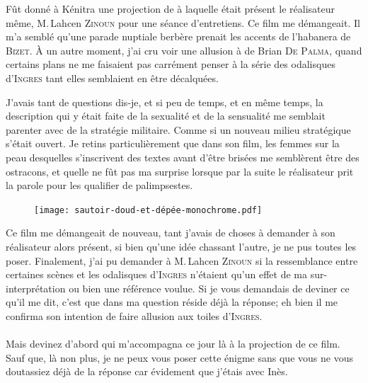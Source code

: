 \begin{prose}
  Fût donné à Kénitra une projection de  à laquelle était présent le réalisateur même, M.\,Lahcen \textsc{Zinoun} pour une séance d’entretiens. Ce film me démangeait. Il m’a semblé qu’une parade nuptiale berbère prenait les accents de l’habanera  de \textsc{Bizet}. À un autre moment, j’ai cru voir une allusion à  de Brian \textsc{De Palma}, quand certains plans ne me faisaient pas carrément penser à la série des odalisques d’\textsc{Ingres} tant elles semblaient en être décalquées.

  J’avais tant de questions dis-je, et si peu de temps, et en même temps, la description qui y était faite de la sexualité et de la sensualité me semblait parenter avec de la stratégie militaire. Comme si un nouveau milieu stratégique s’était ouvert. Je retins particulièrement que dans son film, les femmes sur la peau desquelles s’inscrivent des textes avant d’être brisées me semblèrent être des ostracons, et quelle ne fût pas ma surprise lorsque par la suite le réalisateur prit la parole pour les qualifier de palimpsestes.

\begin{figure}[h]
  \centering
  \texttt{[image: sautoir-doud-et-dépée-monochrome.pdf]}
  \captionsetup{labelformat=empty}
  \caption[Oud et épée ulfberht passés en sautoir]{}
   
\end{figure}

  Ce film me démangeait de nouveau, tant j’avais de choses à demander à son réalisateur alors présent, si bien qu’une idée chassant l’autre, je ne pus toutes les poser. Finalement, j’ai pu demander à M.\,Lahcen \textsc{Zinoun} si la ressemblance entre certaines scènes et les odalisques d’\textsc{Ingres} n’étaient qu’un effet de ma sur-interprétation ou bien une référence voulue. Si je vous demandais de deviner ce qu’il me dit, c’est que dans ma question réside déjà la réponse; eh bien il me confirma son intention de faire allusion aux toiles d’\textsc{Ingres}.

  \paragraph{}
  Mais devinez d’abord qui m’accompagna ce jour là à la projection de ce film. Sauf que, là non plus, je ne peux vous poser cette énigme sans que vous ne vous doutassiez déjà de la réponse car évidement que j’étais avec Inès.
\end{prose}


